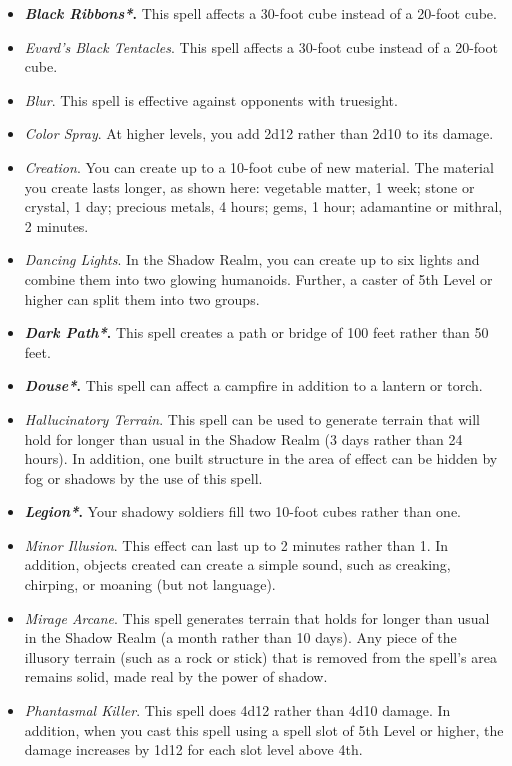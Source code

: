 \documentclass[10pt,a4paper,twoside,bg=print,twocolumn,openany,nodeprecatedcode]{dndbook}
\begin{document}
\begin{itemize}
\item \textbf{\textit{Black Ribbons*}.} This spell affects a 30-foot cube instead of a 20-foot cube.
\item \textit{Evard's Black Tentacles}. This spell affects a 30-foot cube instead of a 20-foot cube.
\item \textit{Blur}. This spell is effective against opponents with truesight.
\item \textit{Color Spray}. At higher levels, you add 2d12 rather than 2d10 to its damage.
\item \textit{Creation}. You can create up to a 10-foot cube of new material. The material you create lasts longer, as shown here: vegetable matter, 1 week; stone or crystal, 1 day; precious metals, 4 hours; gems, 1 hour; adamantine or mithral, 2 minutes.
\item \textit{Dancing Lights}. In the Shadow Realm, you can create up to six lights and combine them into two glowing humanoids. Further, a caster of 5th Level or higher can split them into two groups.
\item \textbf{\textit{Dark Path*}.} This spell creates a path or bridge of 100 feet rather than 50 feet.
\item \textbf{\textit{Douse*}.} This spell can affect a campfire in addition to a lantern or torch.
\item \textit{Hallucinatory Terrain}. This spell can be used to generate terrain that will hold for longer than usual in the Shadow Realm (3 days rather than 24 hours). In addition, one built structure in the area of effect can be hidden by fog or shadows by the use of this spell.
\item \textbf{\textit{Legion*}.} Your shadowy soldiers fill two 10-foot cubes rather than one.
\item \textit{Minor Illusion}. This effect can last up to 2 minutes rather than 1. In addition, objects created can create a simple sound, such as creaking, chirping, or moaning (but not language).
\item \textit{Mirage Arcane}. This spell generates terrain that holds for longer than usual in the Shadow Realm (a month rather than 10 days). Any piece of the illusory terrain (such as a rock or stick) that is removed from the spell's area remains solid, made real by the power of shadow.
\item \textit{Phantasmal Killer}. This spell does 4d12 rather than 4d10 damage. In addition, when you cast this spell using a spell slot of 5th Level or higher, the damage increases by 1d12 for each slot level above 4th.

\end{itemize}
\end{document}
